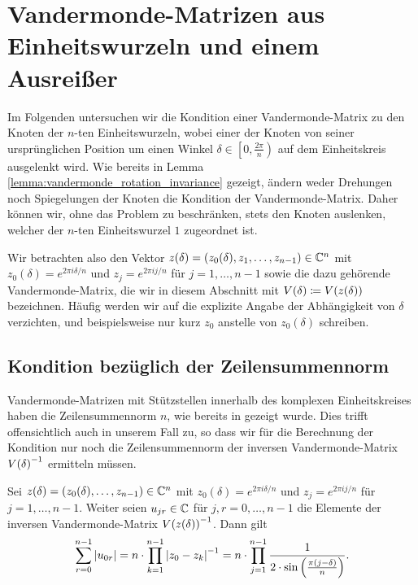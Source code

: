 \section{Vandermonde-Matrizen aus  Einheitswurzeln und einem Ausreißer}

Im Folgenden untersuchen wir die Kondition einer Vandermonde-Matrix zu den
Knoten der $n$-ten Einheitswurzeln, wobei einer der Knoten von seiner
ursprünglichen Position um einen Winkel $\delta \in \left[0,\frac{2
\pi}{n}\right)$ auf dem Einheitskreis ausgelenkt wird.
Wie bereits in Lemma \ref{lemma:vandermonde_rotation_invariance} gezeigt,
ändern weder Drehungen noch Spiegelungen der Knoten die Kondition der
Vandermonde-Matrix.
Daher können wir, ohne das Problem zu beschränken, stets den Knoten auslenken,
welcher der $n$-ten Einheitswurzel $1$ zugeordnet ist.

Wir betrachten also den Vektor $z(\delta) = (z_0(\delta), z_1, \dots, z_{n-1}) \in \mathbb{C}^n$ mit
$z_0(\delta) = e^{2 \pi i \delta / n}$
und
$z_j = e^{2 \pi i j / n}$ für $j = 1, \dots, n-1$
sowie die dazu gehörende Vandermonde-Matrix, die wir in diesem Abschnitt
mit $V \! \left( \delta \right) \coloneqq V \! \left( z(\delta) \right)$ bezeichnen.
Häufig werden wir auf die explizite Angabe der Abhängigkeit von $\delta$
verzichten, und beispielsweise nur kurz $z_0$ anstelle von $z_0(\delta)$
schreiben.

\subsection{Kondition bezüglich der Zeilensummennorm}

Vandermonde-Matrizen mit Stützstellen innerhalb des komplexen Einheitskreises
haben die Zeilensummennorm $n$, wie bereits in
 gezeigt wurde.
Dies trifft offensichtlich auch in unserem Fall zu, so dass wir für die
Berechnung der Kondition nur noch die Zeilensummennorm der inversen
Vandermonde-Matrix $V \! \left( \delta \right)^{-1}$ ermitteln müssen.

\begin{lemma}
    \label{lemma:inverse_outlier_vandermonde_first_row_abs_sum}
    Sei $z(\delta) = (z_0(\delta), \dots, z_{n-1}) \in \mathbb{C}^n$ mit
    $z_0(\delta) = e^{2 \pi i \delta / n}$
    und
    $z_j = e^{2 \pi i j / n}$ für $j = 1, \dots, n-1$.
    Weiter seien $u_{jr} \in \mathbb{C}$ für $j,r = 0,\dots,n-1$ die Elemente der
    inversen Vandermonde-Matrix $V \! \left( z(\delta) \right)^{-1}$.
    Dann gilt
    \[
        \sum_{r=0}^{n-1} \left\lvert  u_{0r}  \right\rvert
        = n \cdot \prod_{k=1}^{n-1} \left\lvert z_0 - z_k \right\rvert^{-1}
        = n \cdot \prod_{j=1}^{n-1} \frac{1}{2 \cdot \sin \left(\frac{\pi (j - \delta)}{n} \right)}.
    \]
\end{lemma}

